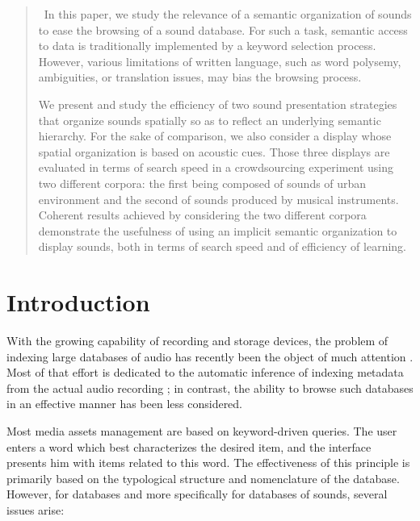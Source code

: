 \documentclass{aes2e}
\begin{document}
\begin{abstract}
~In this paper, we study the relevance of a semantic organization of sounds to ease the browsing of a sound database. For such a task, semantic access to data is traditionally implemented by a keyword selection process. However, various limitations of written language, such as word polysemy, ambiguities, or translation issues, may bias the browsing process.

We present and study the efficiency of two sound presentation strategies that organize sounds spatially so as to reflect an underlying semantic hierarchy. For the sake of comparison, we also consider a display whose spatial organization is based on acoustic cues. Those three displays are evaluated in terms of search speed in a crowdsourcing experiment using two different corpora: the first being composed of sounds of urban environment and the second of sounds produced by musical instruments. Coherent results achieved by considering the two different corpora demonstrate the usefulness of using an implicit semantic organization to display sounds, both in terms of search speed and of efficiency of learning. 
\end{abstract}


\section{Introduction}

With the growing capability of recording and storage devices, the problem of indexing large databases of audio has recently been the object of much attention \cite{Wold1996}. Most of that effort is dedicated to the automatic inference of indexing metadata from the actual audio recording \cite{Zhang1999, tzanetakis2002musical}; in contrast, the ability to browse such databases in an effective manner has been less considered.

Most media assets management are based on keyword-driven queries. The user enters a word which best characterizes the desired item, and the interface presents him with items related to this word. The effectiveness of this principle is primarily based on the typological structure and nomenclature of the database. However, for databases and more specifically for databases of sounds, several issues arise:
\end{document}
